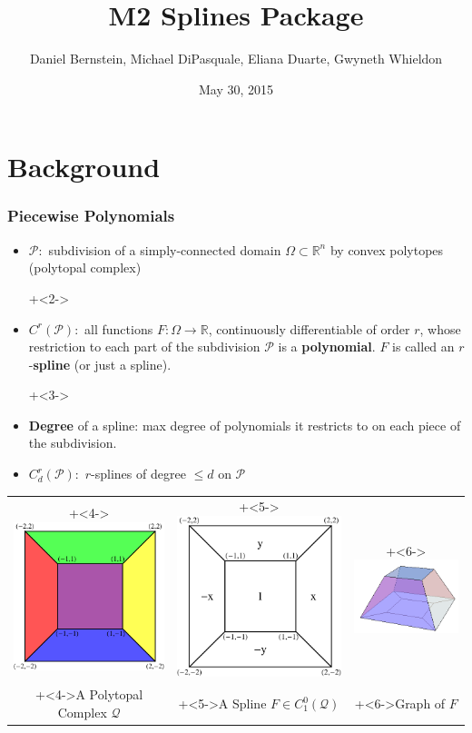 \documentclass{beamer}
\title[M2 Splines Package]{M2 Splines Package}
\author{\large{Daniel Bernstein, Michael DiPasquale, Eliana Duarte, Gwyneth Whieldon}}
\institute{\large{M2 Workshop}\\ \normalsize{Boise State University}}
\date[May 30, 2015]{May 30, 2015}
\theoremstyle{definition}
\theoremstyle{remark}
\newcommand{\QC}{\mathcal{Q}}
\newcommand{\PC}{\mathcal{P}}
\newcommand{\R}{\mathbb{R}}
\begin{document}
\frame{\titlepage}

\section{Background}

\begin{frame}
\frametitle{Piecewise Polynomials}

\begin{itemize}

\item $\PC:$ subdivision of a simply-connected domain $\Omega\subset\R^n$ by convex polytopes (polytopal complex)

\onslide+<2->

\item $C^r(\PC):$ all functions $F:\Omega\rightarrow \R$, continuously differentiable of order $r$, whose restriction to each part of the subdivision $\PC$ is a \textbf{polynomial}.  $F$ is called an $r$-\textbf{spline} (or just a spline).

\onslide+<3->

\item \textbf{Degree} of a spline: max degree of polynomials it restricts to on each piece of the subdivision.

\item $C^r_d(\PC):$ $r$-splines of degree $\le d$ on $\PC$

\end{itemize}

\begin{center}
\begin{tabular}{ccc}
\onslide+<4->{\includegraphics[width=.3\textwidth]{ColorSquareVertexLabelled.pdf}} & \onslide+<5->{\includegraphics[width=.3\textwidth]{ToySplineVertexLabelled.pdf}} & \onslide+<6->{\includegraphics[width=.3\textwidth]{SchlegelCubeNTPL.png}} \\
\onslide+<4->{A Polytopal Complex $\QC$} & \onslide+<5->{A Spline $F\in C^0_1(\QC)$} & \onslide+<6->{Graph of $F$}
\end{tabular}
\end{center}


\end{frame}
\end{document}
